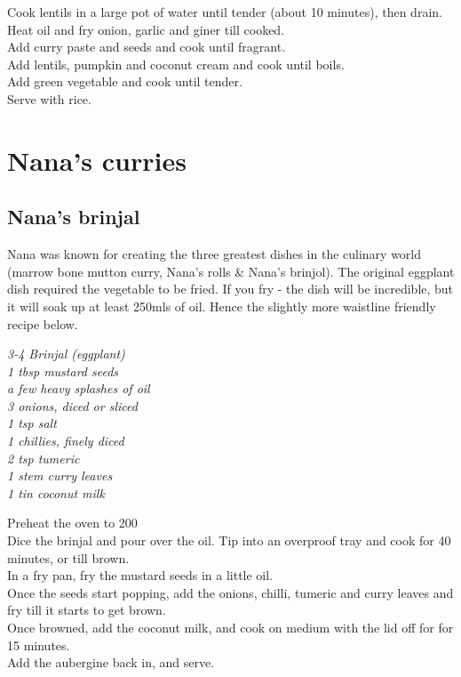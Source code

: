 \documentclass{tufte-book}
\begin{document}
\smallskip
Cook lentils in a large pot of water until tender (about 10 minutes), then drain.
\\Heat oil and fry onion, garlic and giner till cooked. 
\\Add curry paste and seeds and cook until fragrant.
\\Add lentils, pumpkin and coconut cream and cook until boils.
\\Add green vegetable and cook until tender.
\\Serve with rice.

\chapter{Nana's curries}

\section{Nana's brinjal}

Nana was known for creating the three greatest dishes in the culinary world (marrow bone mutton curry, Nana's rolls \& Nana's brinjol). The original eggplant dish required the vegetable to be fried. If you fry - the dish will be incredible, but it will soak up at least 250mls of oil. Hence the slightly more waistline friendly recipe below.

\smallskip
\emph{3-4 Brinjal (eggplant)
\\1 tbsp mustard seeds
\\a few heavy splashes of oil
\\3 onions, diced or sliced
\\1 tsp salt
\\1 chillies, finely diced
\\2 tsp tumeric
\\1 stem curry leaves
\\1 tin coconut milk}

\smallskip
Preheat the oven to 200\celsius 
\\Dice the brinjal and pour over the oil. Tip into an overproof tray and cook for 40 minutes, or till brown.
\\In a fry pan, fry the mustard seeds in a little oil.
\\Once the seeds start popping, add the onions, chilli, tumeric and curry leaves and fry till it starts to get brown.
\\Once browned, add the coconut milk, and cook on medium with the lid off for for 15 minutes.  
\\Add the aubergine back in, and serve.
\end{document}
